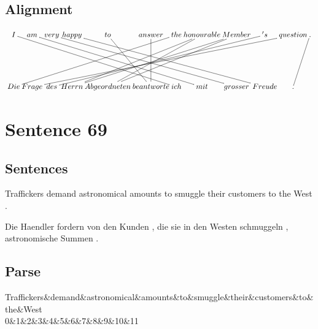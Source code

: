 \documentclass{report}
\begin{document}
\subsection*{Alignment}
\scriptsize{
$
\xymatrix@C-2.3pc{
I \ar @{-} [ddrrrrrr] & am \ar @{-} [ddrrrrrr] & very \ar @{-} [ddrrrrrr] & happy \ar @{-} [ddrrrrrr] & to \ar @{-} [ddr] & answer \ar @{-} [dd] & the \ar @{-} [ddllllll] & honourable \ar @{-} [ddllll] \ar @{-} [ddlll] & Member \ar @{-} [ddlllll] \ar @{-} [ddllll] & 's \ar @{-} [ddlllllll] & question \ar @{-} [ddlllllllll] & . \ar @{-} [ddl]\\\\
Die & Frage & des & Herrn & Abgeordneten & beantworte & ich & mit & grosser & Freude & .
}$}
\newpage\section*{Sentence 69}

\subsection*{Sentences}
Traffickers demand astronomical amounts to smuggle their customers to the West .

\noindent Die Haendler fordern von den Kunden , die sie in den Westen schmuggeln , astronomische Summen .



\subsection*{Parse}
\begin{dependency}[theme=simple]
\begin{deptext}[column sep=.5cm, row sep=.1ex]
Traffickers\&demand\&astronomical\&amounts\&to\&smuggle\&their\&customers\&to\&the\&West\\
0\&1\&2\&3\&4\&5\&6\&7\&8\&9\&10\&11\\
\end{deptext}
\end{dependency}
\end{document}
